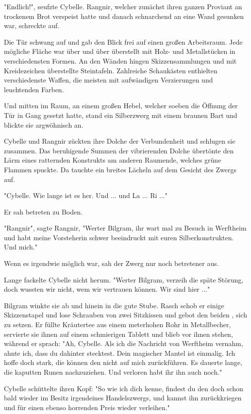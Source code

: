 "Endlich!", seufzte Cybelle. Rangnir, welcher zunächst ihren ganzen Proviant an trockenem Brot verspeist hatte und danach schnarchend an eine Wand gesunken war, schreckte auf.

Die Tür schwang auf und gab den Blick frei auf einen großen Arbeitsraum. Jede mögliche Fläche war über und über überstellt mit Holz- und Metallstücken in verschiedensten Formen. An den Wänden hingen Skizzensammlungen und mit Kreidezeichen überstellte Steintafeln. Zahlreiche Schaukästen enthielten verschiedenste Waffen, die meisten mit aufwändigen Verzierungen und leuchtenden Farben.

Und mitten im Raum, an einem großen Hebel, welcher soeben die Öffnung der Tür in Gang gesetzt hatte, stand ein Silberzwerg mit einem braunen Bart und blickte sie argwöhnisch an.

Cybelle und Rangnir zückten ihre Dolche der Verbundenheit und schlugen sie zusammen. Das beruhigende Summen der vibrierenden Dolche übertönte den Lärm eines ratternden Konstrukts am anderen Raumende, welches grüne Flammen spuckte. Da tauchte ein breites Lächeln auf dem Gesicht des Zwergs auf.

"Cybelle. Wie lange ist es her. Und ... und La ... Ri ..." 

Er sah betreten zu Boden.

"Rangnir", sagte Rangnir, "Werter Bilgram, ihr wart mal zu Besuch in Werftheim und habt meine Vorsteherin schwer beeindruckt mit euren Silberkonstrukten. Und mich."

Wenn es irgendwie möglich war, sah der Zwerg nur noch betretener aus.

Lange fackelte Cybelle nicht herum. "Werter Bilgram, verzeih die späte Störung, doch wussten wir nicht, wem wir vertrauen können. Wir sind hier ..."

Bilgram winkte sie ab und hinein in die gute Stube. Rasch schob er einige Skizzenstapel und lose Schrauben von zwei Sitzkissen und gebot den beiden , sich zu setzen. Er füllte Kräutertee aus einem meterhohen Rohr in Metallbecher, servierte sie ihnen auf einem schmierigen Tablett und blieb vor ihnen stehen, während er sprach: "Ah, Cybelle. Als ich die Nachricht von Werftheim vernahm, ahnte ich, dass du dahinter stecktest. Dein magischer Mantel ist einmalig. Ich hoffe doch stark, die  können den  nicht auf mich zurückführen. Es dauerte lange, die kaputten Runen nachzuziehen. Und verloren habt ihr ihn auch noch."

Cybelle schüttelte ihren Kopf: "So wie ich dich kenne, findest du den doch schon bald wieder im Besitz irgendeines Handelszwergs, und kannst ihn zurückkriegen und für einen ebenso horrenden Preis wieder verleihen."

